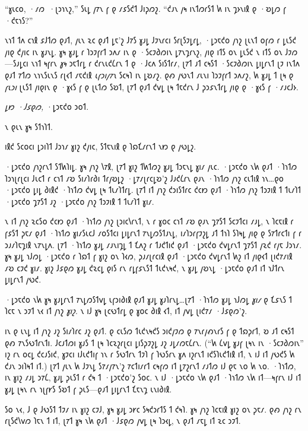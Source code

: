 “𐑣𐑧𐑤𐑴, ·𐑥𐑼~·𐑚𐑮𐑪𐑯𐑟,” 𐑕𐑧𐑛 𐑢𐑳𐑯 𐑝 𐑞 𐑥𐑭𐑕𐑒𐑑 𐑓𐑦𐑜𐑼𐑟. “𐑒𐑨𐑯 𐑢𐑰 𐑦𐑯𐑑𐑼𐑩𐑕𐑑 𐑿 𐑦𐑯 𐑡𐑶𐑯𐑦𐑙 𐑞 ·𐑹𐑛𐑼 𐑝 ·𐑒𐑱𐑪𐑕?”


𐑯𐑪𐑑 𐑑𐑵 𐑤𐑪𐑙 𐑭𐑓𐑑𐑼 𐑞𐑨𐑑, 𐑢𐑧𐑯 𐑷𐑤 𐑞𐑨𐑑 𐑛𐑱'𐑟 𐑓𐑳𐑕 𐑣𐑨𐑛 𐑓𐑲𐑯𐑩𐑤𐑦 𐑕𐑩𐑚𐑕𐑲𐑛𐑩𐑛, ·𐑛𐑮𐑱𐑒𐑴 𐑢𐑪𐑟 𐑚𐑧𐑯𐑑 𐑴𐑝𐑼 𐑩 𐑛𐑧𐑕𐑒 𐑢𐑦𐑞 𐑒𐑢𐑦𐑤 𐑦𐑯 𐑣𐑨𐑯𐑛. 𐑣𐑰 𐑣𐑨𐑛 𐑩 𐑐𐑮𐑲𐑝𐑩𐑑 𐑮𐑵𐑥 𐑦𐑯 𐑞 ·𐑕𐑤𐑲𐑔𐑼𐑦𐑯 𐑛𐑳𐑯𐑡𐑩𐑯𐑟, 𐑢𐑦𐑞 𐑦𐑑𐑕 𐑴𐑯 𐑛𐑧𐑕𐑒 𐑯 𐑦𐑑𐑕 𐑴𐑯 𐑓𐑲𐑼—𐑕𐑨𐑛𐑤𐑦 𐑯𐑪𐑑 𐑰𐑝𐑩𐑯 \emph{𐑣𐑰} 𐑮𐑱𐑑𐑩𐑛 𐑩 𐑒𐑩𐑯𐑧𐑒𐑖𐑩𐑯 𐑑 𐑞 ·𐑓𐑤𐑵 𐑕𐑦𐑕𐑑𐑩𐑥, 𐑚𐑳𐑑 𐑨𐑑 𐑤𐑰𐑕𐑑 ·𐑕𐑤𐑲𐑔𐑼𐑦𐑯 𐑛𐑦𐑛𐑩𐑯𐑑 𐑚𐑲 𐑦𐑯𐑑𐑵 𐑞𐑨𐑑 𐑳𐑑𐑼 𐑯𐑪𐑯𐑕𐑧𐑯𐑕 𐑩𐑚𐑬𐑑 𐑥𐑱𐑒𐑦𐑙 \emph{𐑧𐑝𐑮𐑦𐑢𐑳𐑯} 𐑕𐑤𐑰𐑐 𐑦𐑯 𐑛𐑹𐑥𐑟. 𐑞𐑺 𐑢𐑻𐑯𐑑 𐑥𐑧𐑯𐑦 𐑐𐑮𐑲𐑝𐑩𐑑 𐑮𐑵𐑥𐑟, 𐑿 𐑣𐑨𐑛 𐑑 𐑚𐑰 𐑞 \emph{𐑝𐑧𐑮𐑦} 𐑚𐑧𐑕𐑑 𐑢𐑦𐑞𐑦𐑯 𐑞 ·𐑣𐑬𐑕 𐑝 𐑞 𐑚𐑧𐑑𐑼 𐑕𐑹𐑑, 𐑚𐑳𐑑 𐑞𐑨𐑑 𐑒𐑫𐑛 𐑚𐑰 𐑑𐑱𐑒𐑩𐑯 𐑓 𐑜𐑮𐑭𐑯𐑑𐑩𐑛 𐑢𐑦𐑞 𐑞 ·𐑣𐑬𐑕 𐑝 ·𐑥𐑨𐑤𐑓𐑶.

\emph{𐑛𐑽 ·𐑓𐑭𐑞𐑼,} ·𐑛𐑮𐑱𐑒𐑴 𐑮𐑴𐑑.

𐑯 𐑞𐑧𐑯 𐑣𐑰 𐑕𐑑𐑪𐑐𐑑.

𐑦𐑙𐑒 𐑕𐑤𐑴𐑤𐑦 𐑛𐑮𐑦𐑐𐑑 𐑓𐑮𐑪𐑥 𐑣𐑦𐑟 𐑒𐑢𐑦𐑤, 𐑕𐑑𐑱𐑯𐑦𐑙 𐑞 𐑐𐑸𐑗𐑥𐑩𐑯𐑑 𐑯𐑽 𐑞 𐑢𐑻𐑛𐑟.

·𐑛𐑮𐑱𐑒𐑴 𐑢𐑪𐑟𐑩𐑯𐑑 𐑕𐑑𐑿𐑐𐑦𐑛. 𐑣𐑰 𐑢𐑪𐑟 𐑘𐑳𐑙, 𐑚𐑳𐑑 𐑣𐑦𐑟 𐑑𐑿𐑑𐑼𐑟 𐑣𐑨𐑛 𐑑𐑮𐑱𐑯𐑛 𐑣𐑦𐑥 𐑢𐑧𐑤. ·𐑛𐑮𐑱𐑒𐑴 𐑯𐑿 𐑞𐑨𐑑 ·𐑐𐑪𐑑𐑼 𐑐𐑮𐑪𐑚𐑩𐑚𐑤𐑦 𐑓𐑧𐑤𐑑 𐑩 𐑤𐑪𐑑 𐑥𐑹 𐑕𐑦𐑥𐑐𐑩𐑔𐑦 𐑑𐑩𐑢𐑹𐑛𐑟 ·𐑛𐑳𐑥𐑚𐑩𐑤𐑛𐑹'𐑟 𐑓𐑨𐑒𐑖𐑩𐑯 𐑞𐑨𐑯 ·𐑐𐑪𐑑𐑼 𐑢𐑪𐑟 𐑤𐑧𐑑𐑦𐑙 𐑪𐑯…𐑞𐑴 ·𐑛𐑮𐑱𐑒𐑴 𐑛𐑦𐑛 𐑔𐑦𐑙𐑒 ·𐑐𐑪𐑑𐑼 𐑒𐑫𐑛 𐑚𐑰 𐑑𐑧𐑥𐑐𐑑𐑩𐑛. 𐑚𐑳𐑑 𐑦𐑑 𐑢𐑪𐑟 𐑒𐑮𐑦𐑕𐑑𐑩𐑤 𐑒𐑤𐑽 𐑞𐑨𐑑 ·𐑐𐑪𐑑𐑼 𐑢𐑪𐑟 𐑑𐑮𐑲𐑦𐑙 𐑑 𐑑𐑧𐑥𐑐𐑑 ·𐑛𐑮𐑱𐑒𐑴 𐑡𐑳𐑕𐑑 𐑨𐑟 ·𐑛𐑮𐑱𐑒𐑴 𐑢𐑪𐑟 𐑑𐑮𐑲𐑦𐑙 𐑑 𐑑𐑧𐑥𐑐𐑑 𐑣𐑦𐑥.

𐑯 𐑦𐑑 𐑢𐑪𐑟 𐑷𐑤𐑕𐑴 𐑒𐑤𐑽 𐑞𐑨𐑑 ·𐑐𐑪𐑑𐑼 𐑢𐑪𐑟 𐑚𐑮𐑦𐑤𐑘𐑩𐑯𐑑, 𐑯 𐑩 𐑣𐑴𐑤 𐑤𐑪𐑑 𐑥𐑹 𐑞𐑨𐑯 𐑡𐑳𐑕𐑑 𐑕𐑤𐑲𐑑𐑤𐑦 𐑥𐑨𐑛, 𐑯 𐑐𐑤𐑱𐑦𐑙 𐑩 𐑝𐑭𐑕𐑑 𐑜𐑱𐑥 𐑞𐑨𐑑 ·𐑐𐑪𐑑𐑼 𐑣𐑦𐑥𐑕𐑧𐑤𐑓 𐑥𐑴𐑕𐑑𐑤𐑦 𐑛𐑦𐑛𐑩𐑯𐑑 𐑳𐑯𐑛𐑼𐑕𐑑𐑨𐑯𐑛, 𐑦𐑥𐑐𐑮𐑩𐑝𐑲𐑟𐑛 𐑨𐑑 𐑑𐑪𐑐 𐑕𐑐𐑰𐑛 𐑢𐑦𐑞 𐑞 𐑕𐑳𐑑𐑩𐑤𐑑𐑦 𐑝 𐑩 𐑮𐑨𐑥𐑐𐑱𐑡𐑦𐑙 𐑯𐑳𐑯𐑛𐑵. 𐑚𐑳𐑑 ·𐑐𐑪𐑑𐑼 𐑣𐑨𐑛 𐑥𐑨𐑯𐑦𐑡𐑛 𐑑 𐑗𐑵𐑟 𐑩 𐑑𐑨𐑒𐑑𐑦𐑒 𐑞𐑨𐑑 ·𐑛𐑮𐑱𐑒𐑴 𐑒𐑫𐑛𐑩𐑯𐑑 𐑡𐑳𐑕𐑑 𐑢𐑷𐑒 𐑩𐑢𐑱 𐑓𐑮𐑪𐑥. 𐑣𐑰 𐑣𐑨𐑛 𐑪𐑓𐑼𐑛 ·𐑛𐑮𐑱𐑒𐑴 𐑩 𐑐𐑸𐑑 𐑝 𐑣𐑦𐑟 𐑴𐑯 𐑐𐑬𐑼, 𐑜𐑨𐑥𐑚𐑩𐑤𐑦𐑙 𐑞𐑨𐑑 ·𐑛𐑮𐑱𐑒𐑴 𐑒𐑫𐑛𐑩𐑯𐑑 𐑿𐑟 𐑦𐑑 𐑢𐑦𐑞𐑬𐑑 𐑚𐑦𐑒𐑳𐑥𐑦𐑙 𐑥𐑹 𐑤𐑲𐑒 𐑣𐑦𐑥. 𐑣𐑦𐑟 𐑓𐑭𐑞𐑼 𐑣𐑨𐑛 𐑒𐑷𐑤𐑛 𐑞𐑦𐑕 𐑩𐑯 𐑩𐑛𐑝𐑭𐑯𐑕𐑑 𐑑𐑧𐑒𐑯𐑰𐑒, 𐑯 𐑣𐑨𐑛 𐑢𐑹𐑯𐑛 ·𐑛𐑮𐑱𐑒𐑴 𐑞𐑨𐑑 𐑦𐑑 𐑪𐑓𐑑𐑩𐑯 𐑛𐑦𐑛𐑩𐑯𐑑 𐑢𐑻𐑒.

·𐑛𐑮𐑱𐑒𐑴 𐑯𐑿 𐑣𐑰 𐑣𐑨𐑛𐑩𐑯𐑑 𐑳𐑯𐑛𐑼𐑕𐑑𐑫𐑛 𐑧𐑝𐑮𐑦𐑔𐑦𐑙 𐑞𐑨𐑑 𐑣𐑨𐑛 𐑣𐑨𐑐𐑩𐑯𐑛…𐑚𐑳𐑑 ·𐑐𐑪𐑑𐑼 𐑣𐑨𐑛 𐑪𐑓𐑼𐑛 \emph{𐑣𐑦𐑥} 𐑞 𐑗𐑭𐑯𐑕 𐑑 𐑐𐑤𐑱 𐑯 𐑮𐑲𐑑 𐑯𐑬 𐑦𐑑 𐑢𐑪𐑟 \emph{𐑣𐑦𐑟}. 𐑯 𐑦𐑓 𐑣𐑰 𐑚𐑤𐑻𐑑𐑩𐑛 𐑞 𐑣𐑴𐑤 𐑔𐑦𐑙 𐑬𐑑, 𐑦𐑑 𐑢𐑫𐑛 𐑚𐑦𐑒𐑳𐑥 ·𐑓𐑭𐑞𐑼'𐑟.

𐑦𐑯 𐑞 𐑧𐑯𐑛 𐑦𐑑 𐑢𐑪𐑟 𐑨𐑟 𐑕𐑦𐑥𐑐𐑩𐑤 𐑨𐑟 𐑞𐑨𐑑. 𐑞 𐑤𐑧𐑕𐑼 𐑑𐑧𐑒𐑯𐑰𐑒𐑕 𐑮𐑦𐑒𐑢𐑲𐑼 𐑞 𐑳𐑯𐑩𐑢𐑺𐑯𐑩𐑕 𐑝 𐑞 𐑑𐑸𐑜𐑩𐑑, 𐑹 𐑨𐑑 𐑤𐑰𐑕𐑑 𐑞𐑺 𐑳𐑯𐑕𐑻𐑑𐑩𐑯𐑑𐑦. 𐑓𐑤𐑨𐑑𐑼𐑦 𐑣𐑨𐑕 𐑑 𐑚𐑰 𐑐𐑤𐑷𐑟𐑩𐑚𐑤𐑦 𐑛𐑦𐑕𐑜𐑲𐑟𐑛 𐑨𐑟 𐑨𐑛𐑥𐑼𐑱𐑖𐑩𐑯. (“𐑿 𐑖𐑫𐑛 𐑣𐑨𐑝 𐑚𐑰𐑯 𐑦𐑯 ·𐑕𐑤𐑲𐑔𐑼𐑦𐑯” 𐑦𐑟 𐑩𐑯 𐑴𐑤𐑛 𐑒𐑤𐑨𐑕𐑦𐑒, 𐑣𐑲𐑤𐑦 𐑦𐑓𐑧𐑒𐑑𐑦𐑝 𐑪𐑯 𐑩 𐑕𐑻𐑑𐑩𐑯 𐑑𐑲𐑐 𐑝 𐑐𐑻𐑕𐑩𐑯 𐑣𐑵 𐑦𐑟𐑩𐑯𐑑 𐑦𐑒𐑕𐑐𐑧𐑒𐑑𐑦𐑙 𐑦𐑑, 𐑯 𐑦𐑓 𐑦𐑑 𐑢𐑻𐑒𐑕 𐑿 𐑒𐑨𐑯 𐑮𐑦𐑐𐑰𐑑 𐑦𐑑.) 𐑚𐑳𐑑 𐑢𐑧𐑯 𐑿 𐑓𐑲𐑯𐑛 𐑕𐑳𐑥𐑢𐑳𐑯'𐑟 𐑳𐑤𐑑𐑦𐑥𐑩𐑑 𐑤𐑰𐑝𐑼 𐑦𐑑 𐑛𐑳𐑟𐑩𐑯𐑑 𐑥𐑨𐑑𐑼 𐑦𐑓 𐑞𐑱 𐑯𐑴 𐑿 𐑯𐑴. ·𐑐𐑪𐑑𐑼, 𐑦𐑯 𐑣𐑦𐑟 𐑥𐑨𐑛 𐑮𐑳𐑖, 𐑣𐑨𐑛 𐑜𐑧𐑕𐑑 𐑩 𐑒𐑰 𐑑 ·𐑛𐑮𐑱𐑒𐑴'𐑟 𐑕𐑴𐑤. 𐑯 𐑦𐑓 ·𐑛𐑮𐑱𐑒𐑴 𐑯𐑿 𐑞𐑨𐑑 ·𐑐𐑪𐑑𐑼 𐑯𐑿 𐑦𐑑—𐑰𐑝𐑩𐑯 𐑦𐑓 𐑦𐑑 𐑣𐑨𐑛 𐑚𐑰𐑯 𐑩𐑯 𐑪𐑚𐑝𐑾𐑕 𐑕𐑹𐑑 𐑝 𐑜𐑧𐑕—𐑞𐑨𐑑 𐑛𐑦𐑛𐑩𐑯𐑑 𐑗𐑱𐑯𐑡 𐑧𐑯𐑦𐑔𐑦𐑙.

𐑕𐑴 𐑯𐑬, 𐑓 𐑞 𐑓𐑻𐑕𐑑 𐑑𐑲𐑥 𐑦𐑯 𐑣𐑦𐑟 𐑤𐑲𐑓, 𐑣𐑰 𐑣𐑨𐑛 𐑮𐑾𐑤 𐑕𐑰𐑒𐑮𐑩𐑑𐑕 𐑑 𐑒𐑰𐑐. 𐑣𐑰 𐑢𐑪𐑟 𐑐𐑤𐑱𐑦𐑙 𐑣𐑦𐑟 𐑴𐑯 𐑜𐑱𐑥. 𐑞𐑺 𐑢𐑪𐑟 𐑩𐑯 𐑩𐑚𐑕𐑒𐑘𐑫𐑼 𐑐𐑱𐑯 𐑑 𐑦𐑑, 𐑚𐑳𐑑 𐑣𐑰 𐑯𐑿 𐑞𐑨𐑑 ·𐑓𐑭𐑞𐑼 𐑢𐑫𐑛 𐑚𐑰 𐑐𐑮𐑬𐑛, 𐑯 𐑞𐑨𐑑 𐑥𐑱𐑛 𐑦𐑑 𐑷𐑤 𐑮𐑲𐑑.

